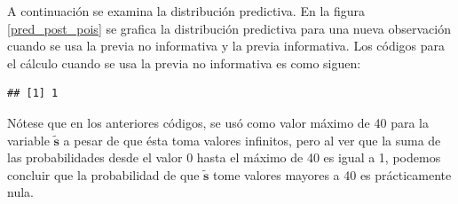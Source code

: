 \begin{Eje}
    A continuaci\'on se examina la distribuci\'on predictiva. En la figura \ref{pred_post_pois} se grafica la distribuci\'on predictiva para una nueva observaci\'on cuando se usa la previa no informativa y la previa informativa. Los c\'odigos para el c\'alculo cuando se usa la previa no informativa es como siguen:
\begin{knitrout}
\color{fgcolor}\begin{kframe}
\begin{alltt}
 \hlkwb{<-} \hlstd{(}\hlstd{,} \hlstd{,} \hlstd{,} \hlstd{,} \hlstd{,} \hlstd{,} \hlstd{,} \hlstd{,} \hlstd{,} \hlstd{,} \hlstd{,} \hlstd{,} \hlstd{,} \hlstd{,} \hlstd{,} \hlstd{,} \hlstd{,} \hlstd{,} \hlstd{,} \hlstd{,}
\hlstd{,} \hlstd{,} \hlstd{,} \hlstd{,} \hlstd{,} \hlstd{,} \hlstd{,} \hlstd{,} \hlstd{,}  \hlstd{)}
 \hlkwb{<-} 
 \hlkwb{<-} \hlstd{(}\hlstd{)\{}
\hlopt{>}\hlstd{)\{}
 \hlkwb{<-} \hlopt{*}\hlopt{/}\hlopt{+}\hlstd{))}\hlopt{^}\hlstd{(}\hlopt{+}\hlstd{)}\hlopt{/}
\hlstd{(}\hlopt{+}\hlstd{)}\hlopt{*}\hlstd{(}\hlopt{:}\hlopt{*}\hlopt{+}\hlstd{)}\hlopt{^}
\hlstd{\}}
\hlopt{==}\hlstd{)\{}
 \hlkwb{<-} \hlopt{/}\hlopt{+}\hlstd{))}\hlopt{^}\hlstd{(}\hlopt{+}\hlstd{)}
\hlstd{\}}
\hlstd{\}}
 \hlkwb{<-}  \hlkwb{<-} \hlopt{:} \hlkwb{<-} \hlstd{()}
  \hlopt{:}
 \hlkwb{<-} 
\hlstd{\}}
\end{alltt}
\begin{verbatim}
## [1] 1
\end{verbatim}
\end{kframe}
\end{knitrout}
    N\'otese que en los anteriores c\'odigos, se us\'o como valor m\'aximo de 40 para la variable $\mathbf{\tilde{s}}$ a pesar de que \'esta toma valores infinitos, pero al ver que la suma de las probabilidades desde el valor 0 hasta el m\'aximo de 40 es igual a 1, podemos concluir que la probabilidad de que $\mathbf{\tilde{s}}$ tome valores mayores a 40 es pr\'acticamente nula.
    

\end{Eje}
